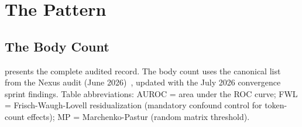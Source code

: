 \documentclass[11pt,a4paper]{article}
\begin{document}
\section{The Pattern}
\label{sec:pattern}

\subsection{The Body Count}

 presents the complete audited record. The
body count uses the canonical list from the Nexus audit (June
2026)~\citep{lyra2026nexus_audit}, updated with the July 2026
convergence sprint findings. Table abbreviations: AUROC = area under
the ROC curve; FWL = Frisch-Waugh-Lovell residualization (mandatory
confound control for token-count effects);
MP = Marchenko-Pastur (random matrix threshold).
\end{document}
